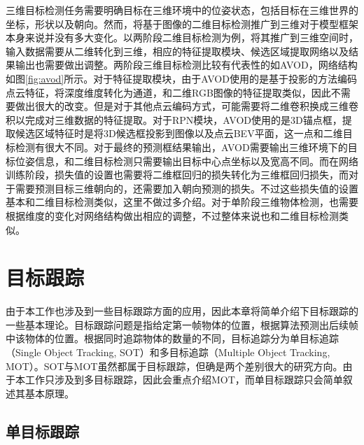 三维目标检测任务需要明确目标在三维环境中的位姿状态，包括目标在三维世界的坐标，形状以及朝向。然而，将基于图像的二维目标检测推广到三维对于模型框架本身来说并没有多大变化。以两阶段二维目标检测为例，将其推广到三维空间时，输入数据需要从二维转化到三维，相应的特征提取模块、候选区域提取网络以及结果输出也需要做出调整。两阶段三维目标检测比较有代表性的如AVOD\cite{ku2018joint}，网络结构如图\ref{fig:avod}所示。对于特征提取模块，由于AVOD使用的是基于投影的方法编码点云特征，将深度维度转化为通道，和二维RGB图像的特征提取类似，因此不需要做出很大的改变。但是对于其他点云编码方式，可能需要将二维卷积换成三维卷积以完成对三维数据的特征提取。对于RPN模块，AVOD使用的是3D锚点框，提取候选区域特征时是将3D候选框投影到图像以及点云BEV平面，这一点和二维目标检测有很大不同。对于最终的预测框结果输出，AVOD需要输出三维环境下的目标位姿信息，和二维目标检测只需要输出目标中心点坐标以及宽高不同。而在网络训练阶段，损失值的设置也需要将二维框回归的损失转化为三维框回归损失，而对于需要预测目标三维朝向的，还需要加入朝向预测的损失。不过这些损失值的设置基本和二维目标检测类似，这里不做过多介绍。对于单阶段三维物体检测，也需要根据维度的变化对网络结构做出相应的调整，不过整体来说也和二维目标检测类似。

%
%

\section{目标跟踪}
\label{object_tracking}
由于本工作也涉及到一些目标跟踪方面的应用，因此本章将简单介绍下目标跟踪的一些基本理论。目标跟踪问题是指给定第一帧物体的位置，根据算法预测出后续帧中该物体的位置。根据同时追踪物体的数量的不同，目标追踪分为单目标追踪（Single Object Tracking, SOT）和多目标追踪（Multiple Object Tracking, MOT）。SOT与MOT虽然都属于目标跟踪，但确是两个差别很大的研究方向。由于本工作只涉及到多目标跟踪，因此会重点介绍MOT，而单目标跟踪只会简单叙述其基本原理。

\subsection{单目标跟踪}
\label{single_tracking}

